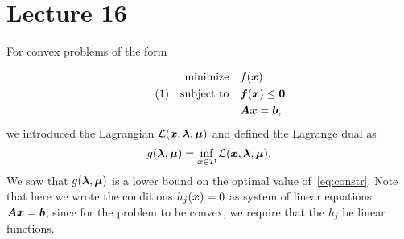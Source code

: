 %
%
% 


\chapter*{Lecture 16}
\addtocounter{chapter}{16}
\addtocounter{section}{0}

For convex problems of the form

\begin{align*}\label{eq:constr}\tag{1}
\begin{split}
 \text{minimize}\quad & f(\bm{x})\\
 \quad\text{subject to}\quad & \bm{f}(\bm{x})\leq \bm{0}\\
         & \bm{A}\bm{x} = \bm{b},
\end{split}
\end{align*}
we introduced the Lagrangian $\mathcal{L}(\bm{x},\bm{\lambda},\bm{\mu})$ and defined the Lagrange dual as
\begin{equation*}
 g(\bm{\lambda},\bm{\mu})=\inf_{\bm{x}\in \mathcal{D}} \mathcal{L}(\bm{x},\bm{\lambda},\bm{\mu}).
\end{equation*}
We saw that $g(\bm{\lambda},\bm{\mu})$ is a lower bound on the optimal value of~\eqref{eq:constr}. Note that here we wrote the conditions $h_j(\bm{x})=0$ as system of linear equations $\bm{A}\bm{x}=\bm{b}$, since for the problem to be convex, we require that the $h_j$ be linear functions.

